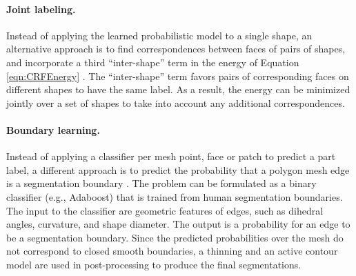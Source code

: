 \begin{table*}[t!]
\begin{tabular}{l|c|c|c}
    \hline
    \end{tabular}%
  \caption{}
  \label{tab:segmentation_running_times}%
\end{table*}



\paragraph*{Joint labeling.} Instead of applying the learned probabilistic model to a single shape, an alternative approach is to find correspondences between faces of pairs of shapes, and incorporate a third ``inter-shape'' term in the energy of Equation \ref{eqn:CRFEnergy} \cite{van-Kaick:2011:PKC}. The ``inter-shape'' term favors pairs of corresponding faces on different shapes to have the same label. As a result, the energy can be minimized jointly over a set of shapes to take into account any additional correspondences.



\paragraph*{Boundary learning.} Instead of applying a classifier per mesh point, face or patch to predict a part label, a different approach is to predict the probability that a polygon mesh edge is a segmentation boundary \cite{Benhabiles:2011:LBE}. The problem can be formulated as a binary classifier (e.g., Adaboost) that is trained from human segmentation boundaries. The input to the classifier are geometric features of edges, such as dihedral angles, curvature, and shape diameter. The output is a probability for an edge to be a segmentation boundary. Since the predicted probabilities over the mesh do not correspond to closed smooth boundaries, a thinning and an active contour model \cite{Kass:1988:SAC} are used in post-processing to produce the final segmentations.

